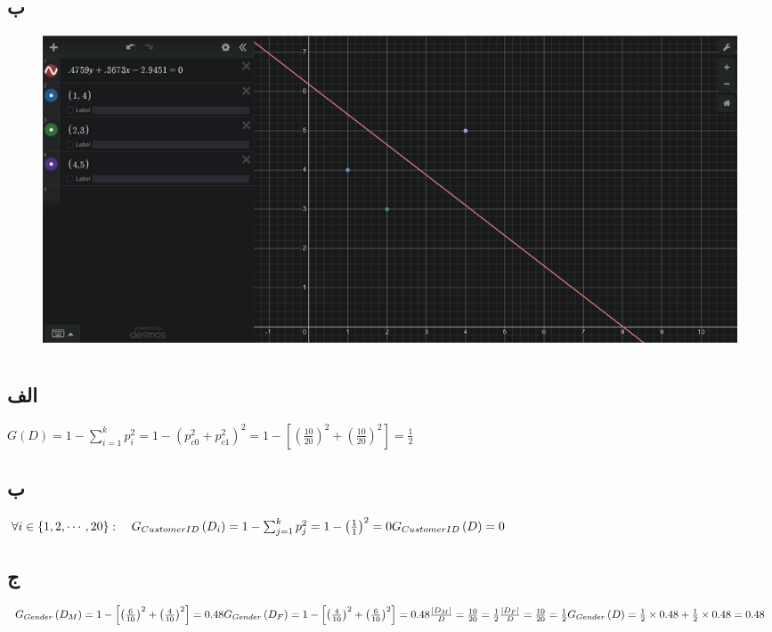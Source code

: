 \documentclass{article}
\begin{document}
\subsection{ب}
\begin{figure}[H]
    \centering
    \includegraphics[width=1\textwidth]{figures/1.jpg}
    \caption
	{}
    \label{fig:fig1}
\end{figure}



\section{}
\subsection{الف}
\begin{latin}
$
G\left( D \right) = 1 - \sum_{i=1}^{k} p_i ^ 2 =
1 - \left( p_{c0}^2 + p_{c1}^2 \right) ^ 2 =
1 - \left[ \left( \frac{10}{20} \right) ^ 2 + \left( \frac{10}{20} \right) ^ 2 \right] = \frac{1}{2}
$
\end{latin}

\subsection{ب}
\begin{latin}
$
\forall i \in \left\{ 1, 2, \cdots, 20 \right\}: \quad G_{CustomerID}\left( D_i \right) = 1 - \sum_{j=1}^{k} p_j ^ 2 = 1 - \left( \frac{1}{1} \right)^2 = 0 \\
G_{CustomerID}\left( D \right) = 0
$
\end{latin}

\subsection{ج}
\begin{latin}
$
G_{Gender}\left( D_M \right) = 1 - \left[ \left( \frac{6}{10} \right)^2 + \left( \frac{4}{10} \right)^2 \right] = 0.48 \\
G_{Gender}\left( D_F \right) = 1 - \left[ \left( \frac{4}{10} \right)^2 + \left( \frac{6}{10} \right)^2 \right] = 0.48 \\
\frac{\left| D_M \right|}{D} = \frac{10}{20} = \frac{1}{2} \\
\frac{\left| D_F \right|}{D} = \frac{10}{20} = \frac{1}{2} \\
G_{Gender}\left( D \right) = \frac{1}{2} \times 0.48 + \frac{1}{2} \times 0.48 = 0.48
$
\end{latin}
\end{document}
